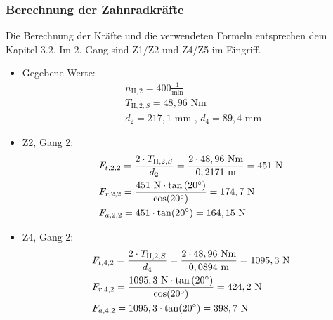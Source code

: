 \subsubsection{Berechnung der Zahnradkräfte}
Die Berechnung der Kräfte und die verwendeten Formeln entsprechen dem Kapitel 3.2. Im 2. Gang sind Z1/Z2 und Z4/Z5 im Eingriff.
\begin{itemize}
\item Gegebene Werte: 
	\begin{align*}
	&n_{\mathrm{II},2} = 400\frac{1}{\text{min}} \\
	&T_{\mathrm{II},2,S} = 48,96\text{ Nm} \\
	&d_2 = 217,1\text{ mm} \text{ , } d_4 = 89,4 \text{ mm } 
	\end{align*}
\item Z2, Gang 2:
	\begin{align*} 
	&F_{t,2,2} = \frac{2\cdot T_{\mathrm{II},2,S}}{d_2} = \frac{2 \cdot 48,96 \text{ Nm}}{0,2171 \text{ m}} = 451 \text{ N}\\ 
	&F_{r,2,2} = \frac{451 \text{ N} \cdot \tan{(20^\circ)}}{\cos(20^\circ)} = 174,7\text{ N}\\ 
	&F_{a,2,2} =451 \cdot \tan(20^\circ) =164,15 \text{ N}
	\end{align*}
\item Z4, Gang 2:
	\begin{align*} 
	&F_{t,4,2} = \frac{2\cdot T_{\mathrm{II},2,S}}{d_4} = \frac{2 \cdot 48,96 \text{ Nm}}{0,0894 \text{ m}} = 1095,3 \text{ N}\\ 
	&F_{r,4,2} = \frac{1095,3 \text{ N} \cdot \tan{(20^\circ)}}{\cos(20^\circ)} = 424,2\text{ N}\\ 
	&F_{a,4,2} =1095,3 \cdot \tan(20^\circ) =398,7 \text{ N}
	\end{align*}
\end{itemize}
\newpage
